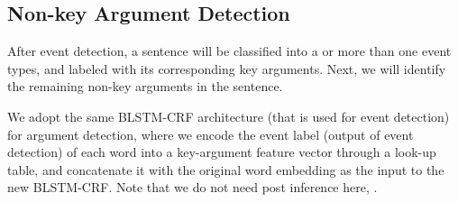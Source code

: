 \subsection{Non-key Argument Detection}
After event detection, a sentence will be classified into a or more than one event types, and labeled with its corresponding key arguments.
Next, we will identify the remaining non-key arguments in the sentence.

We adopt the same BLSTM-CRF architecture (that is used for event detection) for argument detection, where we encode the event label (output
of event detection) of each word into a key-argument feature vector through a look-up table, and concatenate it with the original word
embedding as the input to the new BLSTM-CRF. Note that we do not need post inference here, .
